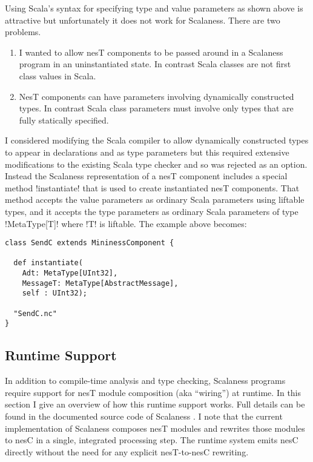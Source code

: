 Using Scala's syntax for specifying type and value parameters as shown above is attractive but
unfortunately it does not work for Scalaness. There are two problems.
\begin{enumerate}
\item I wanted to allow nesT components to be passed around in a Scalaness program in an
  uninstantiated state. In contrast Scala classes are not first class values in Scala.
\item NesT components can have parameters involving dynamically constructed types. In contrast
  Scala class parameters must involve only types that are fully statically specified.
\end{enumerate}

I considered modifying the Scala compiler to allow dynamically constructed types to appear in
declarations and as type parameters but this required extensive modifications to the existing
Scala type checker and so was rejected as an option. Instead the Scalaness representation of a
nesT component includes a special method !instantiate! that is used to create instantiated nesT
components. That method accepts the value parameters as ordinary Scala parameters using liftable
types, and it accepts the type parameters as ordinary Scala parameters of type !MetaType[T]!
where !T! is liftable. The example above becomes:

\singlespace
\begin{lstlisting}[language=scalaness]
class SendC extends MininessComponent {

  def instantiate(
    Adt: MetaType[UInt32],
    MessageT: MetaType[AbstractMessage],
    self : UInt32);

  "SendC.nc"
}
\end{lstlisting}
\primaryspacing


\subsection{Runtime Support}
\label{section-runtime-support}

In addition to compile-time analysis and type checking, Scalaness programs require support for
nesT module composition (aka ``wiring'') at runtime. In this section I give an overview of how
this runtime support works. Full details can be found in the documented source code of Scalaness
\cite{scalaness-home}. I note that the current implementation of Scalaness composes nesT modules
and rewrites those modules to nesC in a single, integrated processing step. The runtime system
emits nesC directly without the need for any explicit nesT-to-nesC rewriting.

